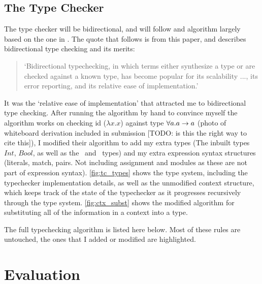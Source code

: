 \subsection{The Type Checker}
The type checker will be bidirectional, and will follow and algorithm largely based on the one in \cite{completebidir}. The quote that follows is from this paper, and describes bidirectional type checking and its merits:
\begin{quote}
`Bidirectional typechecking, in which terms either synthesize a type or are checked against a known type, has become popular for its scalability ..., its error reporting, and its relative ease of implementation.'
\end{quote}
\noindent It was the `relative ease of implementation' that attracted me to bidirectional type checking. After running the algorithm by hand to convince myself the algorithm works on checking id ($\lambda x. x$) against type $\forall a.a\rightarrow a$ (photo of whiteboard derivation included in submission [TODO: is this the right way to cite this]), I modified their algorithm to add my extra types (The inbuilt types $Int$, $Bool$, as well as the \Uniontype\ and \Producttype\ types) and my extra expression syntax structures (literals, match, pairs. Not including assignment and modules as these are not part of expression syntax). \ref{fig:tc_types} shows the type system, including the typechecker implementation details, as well as the unmodified context structure, which keeps track of the state of the typechecker as it progresses recursively through the type system. \ref{fig:ctx_subst} shows the modified algorithm for substituting all of the information in a context into a type. 



The full typechecking algorithm is listed here below. Most of these rules are untouched, the ones that I added or modified are \colorbox{myTcRuleColour}{highlighted}.






\section{Evaluation}

\label{ref:afg_figma}